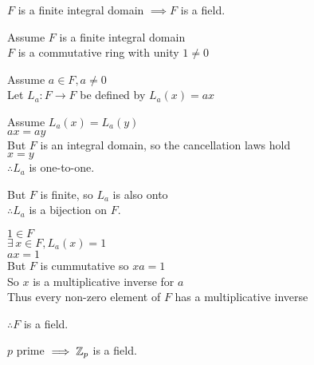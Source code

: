 \documentclass[letterpaper,12pt,fleqn]{article}
\begin{document}
\begin{theorem}
  $F$ is a finite integral domain $\implies F$ is a field.
\end{theorem}
\newpage
\begin{theproof}
  Assume $F$ is a finite integral domain \\
  $F$ is a commutative ring with unity $1\ne0$

  Assume $a\in F,a\ne0$ \\
  Let $L_a:F\to F$ be defined by $L_a(x)=ax$

  Assume $L_a(x)=L_a(y)$ \\
  $ax=ay$ \\
  But $F$ is an integral domain, so the cancellation laws hold \\
  $x=y$ \\
  $\therefore L_a$ is one-to-one.

  But $F$ is finite, so $L_a$ is also onto \\
  $\therefore L_a$ is a bijection on $F$.

  $1\in F$ \\
  $\exists\,x\in F,L_a(x)=1$ \\
  $ax=1$ \\
  But $F$ is cummutative so $xa=1$ \\
  So $x$ is a multiplicative inverse for $a$ \\
  Thus every non-zero element of $F$ has a multiplicative inverse

  $\therefore F$ is a field.
\end{theproof}

\begin{corollary}
  $p$ prime $\implies\mathbb{Z}_p$ is a field.
\end{corollary}
\end{document}
